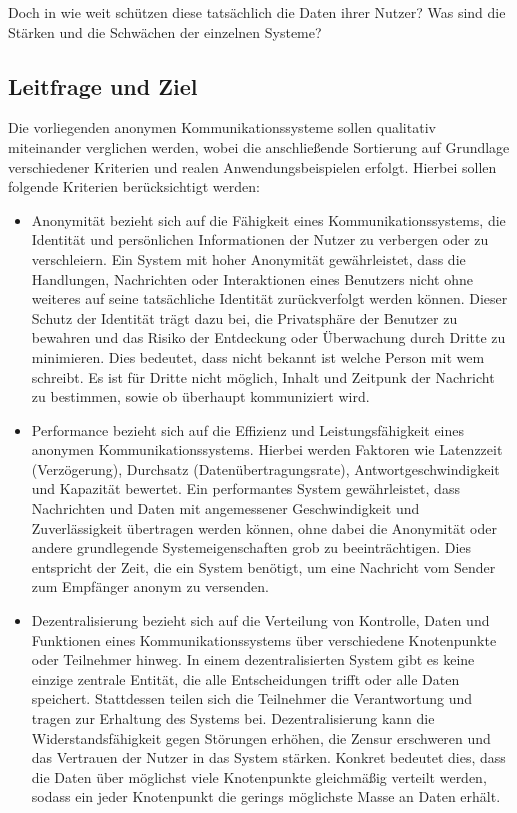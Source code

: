 Doch in wie weit schützen diese tatsächlich die Daten ihrer Nutzer? Was sind die Stärken und die Schwächen der einzelnen Systeme? 

\subsection{Leitfrage und Ziel}

Die vorliegenden anonymen Kommunikationssysteme sollen qualitativ miteinander verglichen werden, wobei die anschließende Sortierung auf Grundlage verschiedener Kriterien und realen Anwendungsbeispielen erfolgt. Hierbei sollen folgende Kriterien berücksichtigt werden:

\begin{itemize}

\item Anonymität bezieht sich auf die Fähigkeit eines Kommunikationssystems, die Identität und persönlichen Informationen der Nutzer zu verbergen oder zu verschleiern. Ein System mit hoher Anonymität gewährleistet, dass die Handlungen, Nachrichten oder Interaktionen eines Benutzers nicht ohne weiteres auf seine tatsächliche Identität zurückverfolgt werden können. Dieser Schutz der Identität trägt dazu bei, die Privatsphäre der Benutzer zu bewahren und das Risiko der Entdeckung oder Überwachung durch Dritte zu minimieren. Dies bedeutet, dass nicht bekannt ist welche Person mit wem schreibt. Es ist für Dritte nicht möglich, Inhalt und Zeitpunk der Nachricht zu bestimmen, sowie ob überhaupt kommuniziert wird.

\item Performance bezieht sich auf die Effizienz und Leistungsfähigkeit eines anonymen Kommunikationssystems. Hierbei werden Faktoren wie Latenzzeit (Verzögerung), Durchsatz (Datenübertragungsrate), Antwortgeschwindigkeit und Kapazität bewertet. Ein performantes System gewährleistet, dass Nachrichten und Daten mit angemessener Geschwindigkeit und Zuverlässigkeit übertragen werden können, ohne dabei die Anonymität oder andere grundlegende Systemeigenschaften grob zu beeinträchtigen. Dies entspricht der Zeit, die ein System benötigt, um eine Nachricht vom Sender zum Empfänger anonym zu versenden.

\item Dezentralisierung bezieht sich auf die Verteilung von Kontrolle, Daten und Funktionen eines Kommunikationssystems über verschiedene Knotenpunkte oder Teilnehmer hinweg. In einem dezentralisierten System gibt es keine einzige zentrale Entität, die alle Entscheidungen trifft oder alle Daten speichert. Stattdessen teilen sich die Teilnehmer die Verantwortung und tragen zur Erhaltung des Systems bei. Dezentralisierung kann die Widerstandsfähigkeit gegen Störungen erhöhen, die Zensur erschweren und das Vertrauen der Nutzer in das System stärken. Konkret bedeutet dies, dass die Daten über möglichst viele Knotenpunkte gleichmäßig verteilt werden, sodass ein jeder Knotenpunkt die gerings möglichste Masse an Daten erhält.


\end{itemize}
